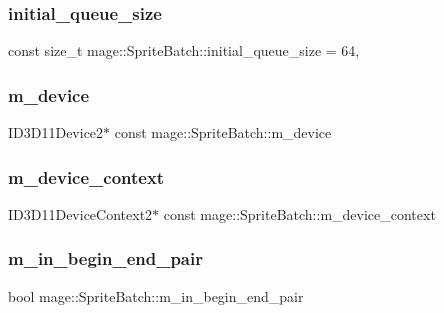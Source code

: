 \subsubsection{\texorpdfstring{initial\+\_\+queue\+\_\+size}{initial\_queue\_size}}
{\footnotesize\ttfamily const size\+\_\+t mage\+::\+Sprite\+Batch\+::initial\+\_\+queue\+\_\+size = 64\hspace{0.3cm}{\ttfamily [static]}, {\ttfamily [private]}}

\hypertarget{classmage_1_1_sprite_batch_abde468ebc16bebb86c9204f69258d196}{}\label{classmage_1_1_sprite_batch_abde468ebc16bebb86c9204f69258d196} 
\subsubsection{\texorpdfstring{m\+\_\+device}{m\_device}}
{\footnotesize\ttfamily I\+D3\+D11\+Device2$\ast$ const mage\+::\+Sprite\+Batch\+::m\+\_\+device\hspace{0.3cm}{\ttfamily [private]}}

\hypertarget{classmage_1_1_sprite_batch_a95d4de79a01ffe5603a2cfa2eddd53b7}{}\label{classmage_1_1_sprite_batch_a95d4de79a01ffe5603a2cfa2eddd53b7} 
\subsubsection{\texorpdfstring{m\+\_\+device\+\_\+context}{m\_device\_context}}
{\footnotesize\ttfamily I\+D3\+D11\+Device\+Context2$\ast$ const mage\+::\+Sprite\+Batch\+::m\+\_\+device\+\_\+context\hspace{0.3cm}{\ttfamily [private]}}

\hypertarget{classmage_1_1_sprite_batch_a2f4e56ee07ef37a2906c552b0ea78403}{}\label{classmage_1_1_sprite_batch_a2f4e56ee07ef37a2906c552b0ea78403} 
\subsubsection{\texorpdfstring{m\+\_\+in\+\_\+begin\+\_\+end\+\_\+pair}{m\_in\_begin\_end\_pair}}
{\footnotesize\ttfamily bool mage\+::\+Sprite\+Batch\+::m\+\_\+in\+\_\+begin\+\_\+end\+\_\+pair\hspace{0.3cm}{\ttfamily [private]}}

